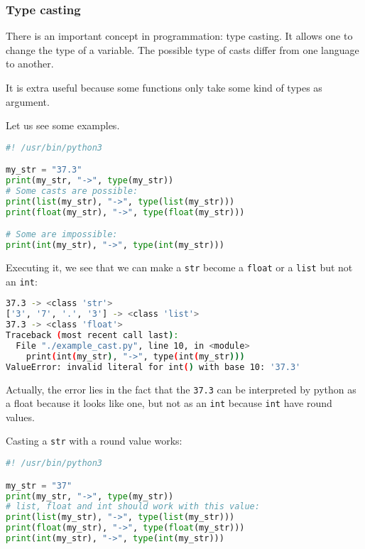 \documentclass[12pt]{article}
\begin{document}
\subsubsection{Type casting}

There is an important concept in programmation: type casting. It allows one to change the type of a variable. The possible type of casts differ from one language to another.

It is extra useful because some functions only take some kind of types as argument.

Let us see some examples.

\begin{lstlisting}[language=python,style=codestyle,title=example\_cast.py]
#! /usr/bin/python3

my_str = "37.3"
print(my_str, "->", type(my_str))
# Some casts are possible:
print(list(my_str), "->", type(list(my_str)))
print(float(my_str), "->", type(float(my_str)))

# Some are impossible:
print(int(my_str), "->", type(int(my_str)))
\end{lstlisting}

Executing it, we see that we can make a \texttt{str} become a \texttt{float} or a \texttt{list} but not an \texttt{int}:

\begin{lstlisting}[language=bash]
37.3 -> <class 'str'>
['3', '7', '.', '3'] -> <class 'list'>
37.3 -> <class 'float'>
Traceback (most recent call last):
  File "./example_cast.py", line 10, in <module>
    print(int(my_str), "->", type(int(my_str)))
ValueError: invalid literal for int() with base 10: '37.3'
\end{lstlisting}

Actually, the error lies in the fact that the \texttt{37.3} can be interpreted by python as a float because it looks like one, but not as an \texttt{int} because \texttt{int} have round values.

Casting a \texttt{str} with a round value works:

\begin{lstlisting}[language=python,style=codestyle,title=example\_cast\_again.py]
#! /usr/bin/python3

my_str = "37"
print(my_str, "->", type(my_str))
# list, float and int should work with this value:
print(list(my_str), "->", type(list(my_str)))
print(float(my_str), "->", type(float(my_str)))
print(int(my_str), "->", type(int(my_str)))
\end{lstlisting}
\end{document}
